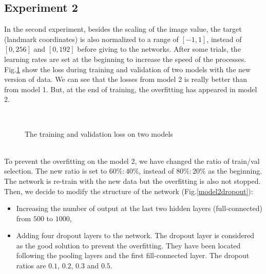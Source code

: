 \documentclass[12pt,a4paper]{article}
\begin{document}
\subsection{Experiment 2}
In the second experiment, besides the scaling of the image value, the target (landmark coordinates) is also normalized to a range of $[-1,1]$, instead of $[0,256]$ and $[0,192]$ before giving to the networks\cite{lecun2012efficient}. After some trials, the learning rates are set at the beginning to increase the speed of the processes. Fig.\ref{expr2} show the loss during training and validation of two models with the new version of data. We can see that the losses from model 2 is really better than from model 1. But, at the end of training, the overfitting has appeared in model 2.
\begin{figure}[h!]
\centering
{}~~
\caption{The training and validation loss on two models}
\label{expr2}
\end{figure}~\\
To prevent the overfitting on the model 2, we have changed the ratio of train/val selection. The new ratio is set to $60\%:40\%$, instead of $80\%:20\%$ as the beginning. The network is re-train with the new data but the overfitting is also not stopped. Then, we decide to modify the structure of the network (Fig.\ref{model2dropout}):
\begin{itemize}
	\item Increasing the number of output at the last two hidden layers (full-connected) from $500$ to $1000$,
	\item Adding four dropout layers to the network. The dropout layer is considered as the good solution to prevent the overfitting\cite{srivastava2014dropout}. They have been located following the pooling layers and the first fill-connected layer. The dropout ratios are $0.1$, $0.2$, $0.3$ and $0.5$.
\end{itemize}
\end{document}
